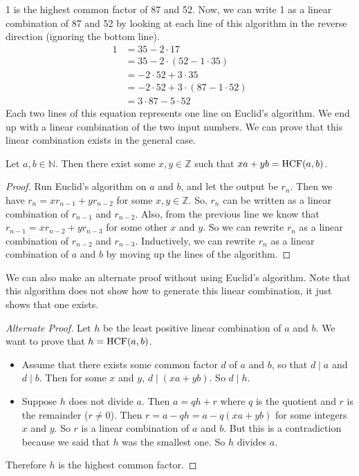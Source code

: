 1 is the highest common factor of 87 and 52.
Now, we can write 1 as a linear combination of 87 and 52 by looking at each line of this algorithm in the reverse direction (ignoring the bottom line).
\begin{align*}
	1 & = 35 - 2 \cdot 17                         \\
	  & = 35 - 2 \cdot (52 - 1 \cdot 35)          \\
	  & = -2 \cdot 52 + 3 \cdot 35                \\
	  & = -2 \cdot 52 + 3 \cdot (87 - 1 \cdot 52) \\
	  & = 3 \cdot 87 - 5 \cdot 52
\end{align*}
Each two lines of this equation represents one line on Euclid's algorithm.
We end up with a linear combination of the two input numbers.
We can prove that this linear combination exists in the general case.
\begin{theorem}
	Let \(a, b \in \mathbb N\).
	Then there exist some \(x, y \in \mathbb Z\) such that \(xa + yb = \operatorname{HCF}(a, b)\).
\end{theorem}
\begin{proof}
	Run Euclid's algorithm on \(a\) and \(b\), and let the output be \(r_n\).
	Then we have \(r_n = x r_{n-1} + y r_{n-2}\) for some \(x, y \in \mathbb Z\).
	So, \(r_n\) can be written as a linear combination of \(r_{n-1}\) and \(r_{n-2}\).
	Also, from the previous line we know that \(r_{n-1} = x r_{n-2} + y r_{n-3}\) for some other \(x\) and \(y\).
	So we can rewrite \(r_{n}\) as a linear combination of \(r_{n-2}\) and \(r_{n-3}\).
	Inductively, we can rewrite \(r_n\) as a linear combination of \(a\) and \(b\) by moving up the lines of the algorithm.
\end{proof}
We can also make an alternate proof without using Euclid's algorithm.
Note that this algorithm does not show how to generate this linear combination, it just shows that one exists.
\begin{proof}[Alternate Proof]
	Let \(h\) be the least positive linear combination of \(a\) and \(b\).
	We want to prove that \(h = \operatorname{HCF} (a, b)\).
	\begin{itemize}
		\item Assume that there exists some common factor \(d\) of \(a\) and \(b\), so that \(d\mid a\) and \(d\mid b\).
		      Then for some \(x\) and \(y\), \(d \mid (xa + yb)\).
		      So \(d \mid h\).
		\item Suppose \(h\) does not divide \(a\).
		      Then \(a = qh + r\) where \(q\) is the quotient and \(r\) is the remainder (\(r \neq 0\)).
		      Then \(r = a - qh = a - q(xa + yb)\) for some integers \(x\) and \(y\).
		      So \(r\) is a linear combination of \(a\) and \(b\).
		      But this is a contradiction because we said that \(h\) was the smallest one.
		      So \(h\) divides \(a\).
	\end{itemize}
	Therefore \(h\) is the highest common factor.
\end{proof}


